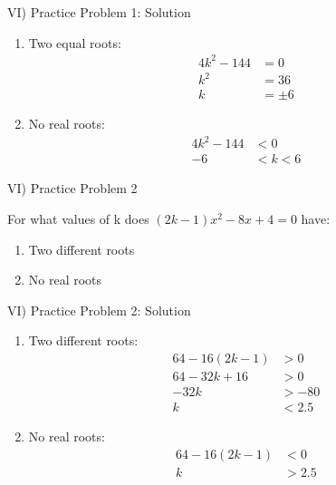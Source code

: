 \documentclass[aspectratio=169]{beamer}
\begin{document}
\begin{frame}{VI) Practice Problem 1: Solution}
    \begin{tcolorbox}[colback=lightgray,colframe=accent,title=Solution]
        \footnotesize
        \begin{enumerate}
            \item Two equal roots:
            \begin{align*}
                4k^2-144 &= 0\\
                k^2 &= 36\\
                k &= \pm 6
            \end{align*}
            
            \item No real roots:
            \begin{align*}
                4k^2-144 &< 0\\
                -6 &< k < 6
            \end{align*}
        \end{enumerate}
    \end{tcolorbox}
\end{frame}

\begin{frame}{VI) Practice Problem 2}
    \begin{tcolorbox}[colback=lightgray,colframe=primary,title=Problem]
        \footnotesize
        For what values of k does $(2k-1)x^2-8x+4=0$ have:
        \begin{enumerate}
            \item Two different roots
            \item No real roots
        \end{enumerate}
    \end{tcolorbox}
\end{frame}

\begin{frame}{VI) Practice Problem 2: Solution}
    \begin{tcolorbox}[colback=lightgray,colframe=accent,title=Solution]
        \footnotesize
        \begin{enumerate}
            \item Two different roots:
            \begin{align*}
                64-16(2k-1) &> 0\\
                64-32k+16 &> 0\\
                -32k &> -80\\
                k &< 2.5
            \end{align*}
            
            \item No real roots:
            \begin{align*}
                64-16(2k-1) &< 0\\
                k &> 2.5
            \end{align*}
        \end{enumerate}
    \end{tcolorbox}
\end{frame}
\end{document}
